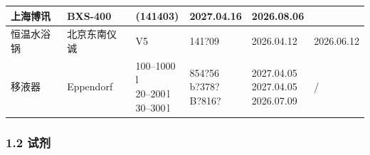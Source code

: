 \documentclass[UTF8,10pt,a4paper,fontset=fandol]{ctexart}
\newcommand{\fieldvalue}[1]{#1}
\newcommand{\handwritten}[1]{#1}
\begin{document}
\begin{tabular}{|p{2.0cm}|p{1.7cm}|p{2.0cm}|p{2.1cm}|p{2.1cm}|p{2.1cm}|}
\fieldvalue{上海博讯} &
\fieldvalue{BXS-400} &
\fieldvalue{\handwritten{(141403)}} &
\fieldvalue{\handwritten{2027.04.16}} &
\fieldvalue{\handwritten{2026.08.06}} \\
\hline
恒温水浴锅 &
\fieldvalue{北京东南仪诚} &
\fieldvalue{V5} &
\fieldvalue{\handwritten{141?09}} &
\fieldvalue{\handwritten{2026.04.12}} &
\fieldvalue{\handwritten{2026.06.12}} \\
\hline
\multirow{3}{*}{移液器} &
\fieldvalue{Eppendorf} &
\fieldvalue{\handwritten{100--1000\,\textmu l\\20--200\,\textmu l\\30--300\,\textmu l}} &
\fieldvalue{\handwritten{854?56\\b?378?\\B?816?}} &
\fieldvalue{\handwritten{2027.04.05\\2027.04.05\\2026.07.09}} &
\fieldvalue{\handwritten{/}} \\
\hline
\end{tabular}

\normalsize
\subsubsection*{1.2 试剂}
\end{document}
